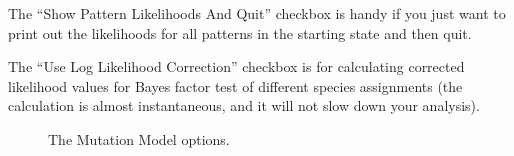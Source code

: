 {{    The ``Show Pattern Likelihoods And Quit'' checkbox is handy if you just want to print out the likelihoods for all patterns in the starting state and then quit.
    
    The ``Use Log Likelihood Correction'' checkbox is for calculating corrected likelihood values for Bayes factor test of different species assignments (the calculation is almost instantaneous, and it will not slow down your analysis).
        
    }
    
        \begin{figure}[htbp]
        \centering
        \caption{The Mutation Model options.}
        \label{fig:beauti-mutation}
    \end{figure}
}

